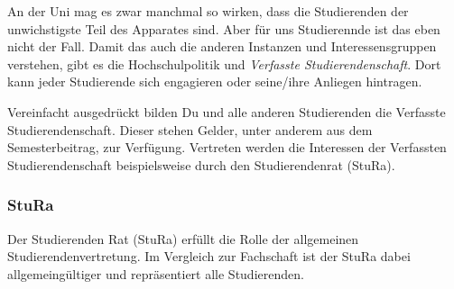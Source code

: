 An der Uni mag es zwar manchmal so wirken, dass die Studierenden der unwichstigste
Teil des Apparates sind.
Aber für uns Studierennde ist das eben nicht der Fall.
Damit das auch die anderen Instanzen und Interessensgruppen verstehen, gibt es die Hochschulpolitik und \textit{Verfasste
Studierendenschaft}. Dort kann jeder Studierende sich engagieren oder seine/ihre
Anliegen hintragen.


Vereinfacht ausgedrückt bilden Du und alle anderen Studierenden die Verfasste Studierendenschaft. 
Dieser stehen Gelder, unter anderem aus dem Semesterbeitrag, zur Verfügung. 
Vertreten werden die Interessen der Verfassten Studierendenschaft beispielsweise durch den Studierendenrat (StuRa).




\subsubsection{StuRa}

Der Studierenden Rat (StuRa) erfüllt die Rolle der allgemeinen Studierendenvertretung. 
Im Vergleich zur Fachschaft ist der StuRa dabei allgemeingültiger und repräsentiert alle Studierenden. 

